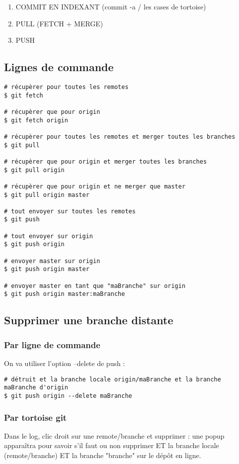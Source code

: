 \begin{enumerate}
\item COMMIT EN INDEXANT (commit -a / les cases de tortoise)
\item PULL (FETCH + MERGE)
\item PUSH
\end{enumerate}
\newpage
\subsection*{Lignes de commande}
\begin{verbatim}
# récupèrer pour toutes les remotes
$ git fetch 

# récupèrer que pour origin
$ git fetch origin

# récupèrer pour toutes les remotes et merger toutes les branches
$ git pull

# récupèrer que pour origin et merger toutes les branches
$ git pull origin

# récupèrer que pour origin et ne merger que master
$ git pull origin master

# tout envoyer sur toutes les remotes
$ git push

# tout envoyer sur origin
$ git push origin

# envoyer master sur origin
$ git push origin master

# envoyer master en tant que "maBranche" sur origin
$ git push origin master:maBranche
\end{verbatim}

\subsection{Supprimer une branche distante}
\subsubsection{Par ligne de commande}
On va utiliser l'option --delete de push :
\begin{verbatim}
# détruit et la branche locale origin/maBranche et la branche maBranche d'origin
$ git push origin --delete maBranche
\end{verbatim}
\subsubsection{Par tortoise git}
Dans le log, clic droit sur une remote/branche et supprimer : une popup apparaîtra pour savoir s'il faut ou non supprimer ET la branche locale (remote/branche) ET la branche "branche" sur le dépôt en ligne.